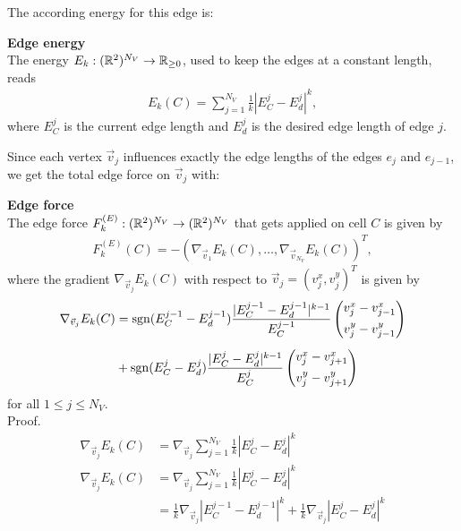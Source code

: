 The according energy for this edge is:
\begin{definition} \textbf{Edge energy} \\
	The energy $E_k: (\mathbb{R}^2)^{N_V} \rightarrow \mathbb{R}_{\geq 0}$, used to keep the edges at a constant length, reads 
	\begin{align}
		E_k(C) =  \sum\limits_{j=1}^{N_V} \frac{1}{k} |E^j_{C} - E^{j}_d|^k, \label{eq:edgeEnergy} 
	\end{align}
	where $E^j_{C}$ is the current edge length and $E^{j}_d$ is the desired edge length of edge $j$. 
\end{definition}

Since each vertex $\vec{v}_j$ influences exactly the edge lengths of the edges $e_{j}$ and $e_{j-1}$, we get the total edge force on $\vec{v}_j$ with: 

\begin{proposition} \textbf{Edge force} \\

	The edge force $F_{k}^{(E)}: (\mathbb{R}^2)^{N_V} \rightarrow (\mathbb{R}^2)^{N_V}$ that gets applied on cell $C$ is given by  
	\begin{align*}
		F_{k}^{(E)}(C) 
		= - (\nabla_{\vec{v}_1} E_k(C), \ldots, \nabla_{\vec{v}_{N_V}} E_k(C))^T,
	\end{align*}
	where the gradient $\nabla_{\vec{v}_j} E_k(C)$ with respect to $\vec{v}_j = (v_{j}^{x}, v_{j}^{y})^T$ is given by 
	\begin{align}
		\begin{split}
			\nabla_{\vec{v}_j} E_k(C) &= \operatorname{sgn}(E^{j-1}_{C}- E_d^{j-1}) \dfrac{|E^{j-1}_{C}- E_d^{j-1}|^{k-1}}{E^{j-1}_{C}}  
			\begin{pmatrix} v_{j}^{x} - v_{j-1}^{x} \\[0.5em]  v_{j}^{y} - v_{j-1}^{y}  \end{pmatrix} \\[0.5em]
			&+ \operatorname{sgn}(E^j_{C} - E_d^{j}) \dfrac{|E^j_{C} - E_d^{j}|^{k-1}}{E^j_{C}}  
			\begin{pmatrix} v_{j}^{x} - v_{j+1}^{x} \\[0.5em]  v_{j}^{y} - v_{j+1}^{y} \end{pmatrix}
		\end{split}
		\label{gradient:edge}
	\end{align}
	for all $1 \leq j \leq N_V$.\\

	Proof. \\

	\begin{align*}
		\nabla_{\vec{v}_{j}} E_k(C) &= \nabla_{\vec{v}_{j}} \sum\limits_{j=1}^{N_V} \frac{1}{k} |E^j_{C} - E^{j}_d|^k \\
		\nabla_{\vec{v}_{j}} E_k(C) &= \nabla_{\vec{v}_{j}} \sum\limits_{j=1}^{N_V} \frac{1}{k} |E^j_{C} - E^{j}_d|^k \\
		&= \frac{1}{k} \nabla_{\vec{v}_{j}} |E^{j-1}_{C} - E^{j-1}_d|^k + \frac{1}{k}\nabla_{\vec{v}_{j}} |E^j_{C} - E^{j}_d|^k 
	\end{align*}


\end{proposition}
